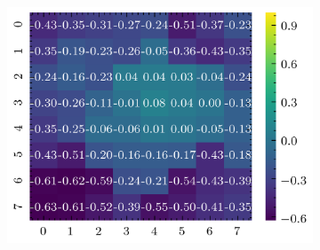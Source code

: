 \begin{figure}[H]
\begin{subfigure}[b]{0.19\textwidth}
        \includegraphics[width=\linewidth]{../img/5/quarry/false_negative/heatmap-2d-4.png}
    \end{subfigure}  


\end{figure}
